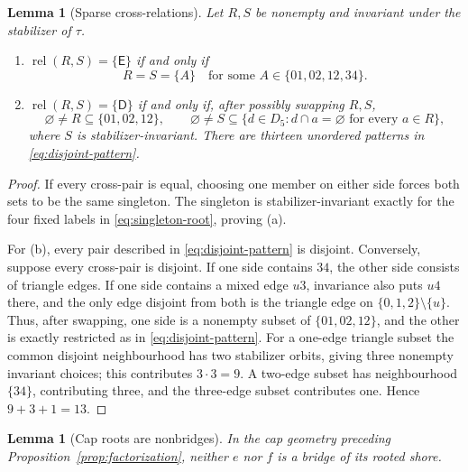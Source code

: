 \documentclass[11pt]{article}
\newtheorem{lemma}[theorem]{Lemma}
\theoremstyle{definition}
\theoremstyle{remark}
\begin{document}
\begin{lemma}[Sparse cross-relations]\label{lem:sparse-relations}
Let \(R,S\) be nonempty and invariant under the stabilizer of \(\tau\).
\begin{enumerate}[label=(\alph*),leftmargin=2.4em]
\item
\(\operatorname{rel}(R,S)=\{\mathsf E\}\) if and only if
\[
 R=S=\{A\}\quad\text{for some }
 A\in\{01,02,12,34\}.                                  \tag{6.8}
 \label{eq:singleton-root}
\]
\item
\(\operatorname{rel}(R,S)=\{\mathsf D\}\) if and only if, after
possibly swapping \(R,S\),
\[
 \varnothing\neq R\subseteq\{01,02,12\},\qquad
 \varnothing\neq S\subseteq
 \{d\in D_5:d\cap a=\varnothing\text{ for every }a\in R\},
                                                               \tag{6.9}
 \label{eq:disjoint-pattern}
\]
where \(S\) is stabilizer-invariant.  There are thirteen unordered
patterns in \eqref{eq:disjoint-pattern}.
\end{enumerate}
\end{lemma}

\begin{proof}
If every cross-pair is equal, choosing one member on either side forces
both sets to be the same singleton.  The singleton is
stabilizer-invariant exactly for the four fixed labels in
\eqref{eq:singleton-root}, proving (a).

For (b), every pair described in \eqref{eq:disjoint-pattern} is
disjoint.
Conversely, suppose every cross-pair is disjoint.  If one side contains
\(34\), the other side consists of triangle edges.  If one side
contains a mixed edge \(u3\), invariance also puts \(u4\) there, and
the only edge disjoint from both is the triangle edge on
\(\{0,1,2\}\setminus\{u\}\).  Thus, after swapping, one side is a
nonempty subset of \(\{01,02,12\}\), and the other is exactly restricted
as in \eqref{eq:disjoint-pattern}.  For a one-edge triangle subset the common
disjoint neighbourhood has two stabilizer orbits, giving three nonempty
invariant choices; this contributes \(3\cdot3=9\).  A two-edge subset
has neighbourhood \(\{34\}\), contributing three, and the three-edge
subset contributes one.  Hence \(9+3+1=13\).
\end{proof}

\begin{lemma}[Cap roots are nonbridges]\label{lem:cap-nonbridge}
In the cap geometry preceding Proposition~\ref{prop:factorization},
neither \(e\) nor \(f\) is a bridge of its rooted shore.
\end{lemma}
\end{document}
